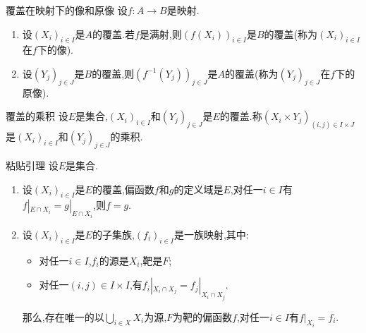 \begin{proposition}{覆盖在映射下的像和原像}{}
	设$f:A\to B$是映射.
	\begin{enumerate}
		\item 设$\left(X_{i}\right)_{i\in I}$是$A$的覆盖.若$f$是满射,则$\left(f\left(X_{i}\right)\right)_{i\in I}$是$B$的覆盖(称为$\left(X_{i}\right)_{i\in I}$在$f$下的像).
		\item 设$\left(Y_{j}\right)_{j\in J}$是$B$的覆盖,则$\left(f^{-1}\left(Y_{j}\right)\right)_{j\in J}$是$A$的覆盖(称为$\left(Y_{j}\right)_{j\in J}$在$f$下的原像).
	\end{enumerate}
\end{proposition}

\begin{definition}{覆盖的乘积}{}
	设$E$是集合,$\left(X_{i}\right)_{i\in I}$和$\left(Y_{j}\right)_{j\in J}$是$E$的覆盖.称$\left(X_{i}\times Y_{j}\right)_{\left(i,j\right)\in I\times J}$是$\left(X_{i}\right)_{i\in I}$和$\left(Y_{j}\right)_{j\in J}$的乘积.
\end{definition}

\begin{proposition}{粘贴引理}{}
	设$E$是集合.
	\begin{enumerate}
		\item 设$\left(X_{i}\right)_{i\in I}$是$E$的覆盖,偏函数$f$和$g$的定义域是$E$,对任一$i\in I$有$f|_{E\cap X_{i}}=g|_{E\cap X_{i}}$,则$f=g$.
		\item 设$\left(X_{i}\right)_{i\in I}$是$E$的子集族,$\left(f_{i}\right)_{i\in I}$是一族映射,其中:
		\begin{itemize}
			\item 对任一$i\in I$,$f_{i}$的源是$X_{i}$,靶是$F$;
			\item 对任一$\left(i,j\right)\in I\times I$,有$f_{i}|_{X_{i}\cap X_{j}}=f_{j}|_{X_{i}\cap X_{j}}$.
		\end{itemize}
		那么,存在唯一的以$\bigcup\limits_{i\in X}X_{i}$为源,$F$为靶的偏函数$f$,对任一$i\in I$有$f|_{X_{i}}=f_{i}$.
	\end{enumerate}
\end{proposition}




































